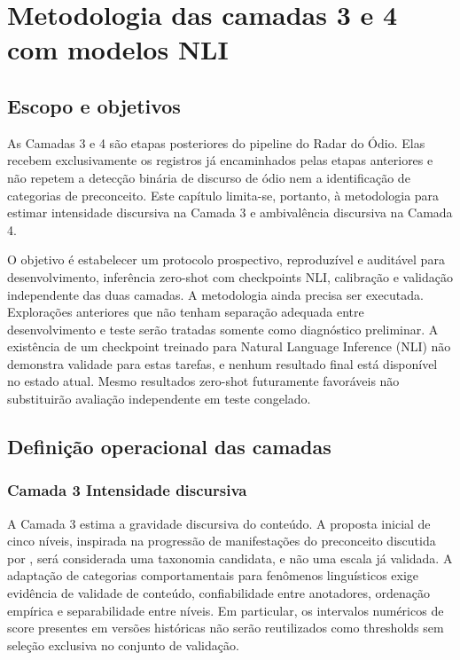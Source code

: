 \chapter{Metodologia das camadas 3 e 4 com modelos NLI}


\section{Escopo e objetivos}
\label{sec:escopo-objetivos}

As Camadas 3 e 4 são etapas posteriores do pipeline do Radar do Ódio. Elas recebem exclusivamente os registros já encaminhados pelas etapas anteriores e não repetem a detecção binária de discurso de ódio nem a identificação de categorias de preconceito. Este capítulo limita-se, portanto, à metodologia para estimar intensidade discursiva na Camada 3 e ambivalência discursiva na Camada 4.

O objetivo é estabelecer um protocolo prospectivo, reproduzível e auditável para desenvolvimento, inferência zero-shot com checkpoints NLI, calibração e validação independente das duas camadas. A metodologia ainda precisa ser executada. Explorações anteriores que não tenham separação adequada entre desenvolvimento e teste serão tratadas somente como diagnóstico preliminar. A existência de um checkpoint treinado para Natural Language Inference (NLI) não demonstra validade para estas tarefas, e nenhum resultado final está disponível no estado atual. Mesmo resultados zero-shot futuramente favoráveis não substituirão avaliação independente em teste congelado.

\section{Definição operacional das camadas}
\label{sec:definicao-operacional}

\subsection{Camada 3 Intensidade discursiva}

A Camada 3 estima a gravidade discursiva do conteúdo. A proposta inicial de cinco níveis, inspirada na progressão de manifestações do preconceito discutida por , será considerada uma taxonomia candidata, e não uma escala já validada. A adaptação de categorias comportamentais para fenômenos linguísticos exige evidência de validade de conteúdo, confiabilidade entre anotadores, ordenação empírica e separabilidade entre níveis. Em particular, os intervalos numéricos de score presentes em versões históricas não serão reutilizados como thresholds sem seleção exclusiva no conjunto de validação.


